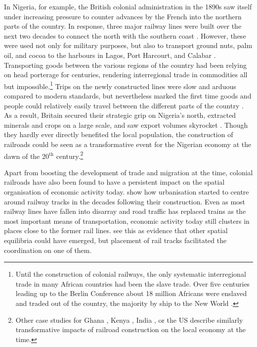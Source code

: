 \documentclass[11pt, oneside]{article}   	%
\begin{document}
In Nigeria, for example, the British colonial administration in the 1890s saw itself under increasing pressure to counter advances by the French into the northern parts of the country. In response, three major railway lines were built over the next two decades to connect the north with the southern coast \citep{Falola_historyNigeria_2008}. However, these were used not only for military purposes, but also to transport ground nuts, palm oil, and cocoa to the harbours in Lagos, Port Harcourt, and Calabar \citep{Ekundare_EconomicHistoryNigeria_1973}. Transporting goods between the various regions of the country had been relying on head porterage for centuries, rendering interregional trade in commodities all but impossible.\footnote{Until the construction of colonial railways, the only systematic interregional trade in many African countries had been the slave trade. Over five centuries leading up to the Berlin Conference about 18 million Africans were enslaved and traded out of the country, the majority by ship to the New World \citep{Nunn_LongtermEffectsAfrica_2008}.} Trips on the newly constructed lines were slow and arduous compared to modern standards, but nevertheless marked the first time goods and people could relatively easily travel between the different parts of the country \citep{Chaves_ReinventingWheelEconomic_2014}. As a result, Britain secured their strategic grip on Nigeria's north, extracted minerals and crops on a large scale, and saw export volumes skyrocket \citep{Falola_historyNigeria_2008,Woltjer_EconomicRationaleWest_2018}. Though they hardly ever directly benefited the local population, the construction of railroads could be seen as a transformative event for the Nigerian economy at the dawn of the 20$^{\textrm{th}}$ century.\footnote{Other case studies for Ghana \citep{Jedwab_PermanentEffectsTransportation_2016a}, Kenya \citep{Jedwab_HistoryPathDependence_2017a}, India \citep{Donaldson_RailroadsRajEstimating_2018}, or the US \citep{donaldson_railroads_2016,Swisher_ReassessingRailroadsGrowth_2017} describe similarly transformative impacts of railroad construction on the local economy at the time.}

Apart from boosting the development of trade and migration at the time, colonial railroads have also been found to have a persistent impact on the spatial organisation of economic activity today. \cite{Jedwab_PermanentEffectsTransportation_2016a} show how urbanisation started to centre around railway tracks in the decades following their construction. Even as most railway lines have fallen into disarray and road traffic has replaced trains as the most important means of transportation, economic activity today still clusters in places close to the former rail lines. \citeauthor{Jedwab_PermanentEffectsTransportation_2016a} see this as evidence that other spatial equilibria could have emerged, but placement of rail tracks facilitated the coordination on one of them.
\end{document}
